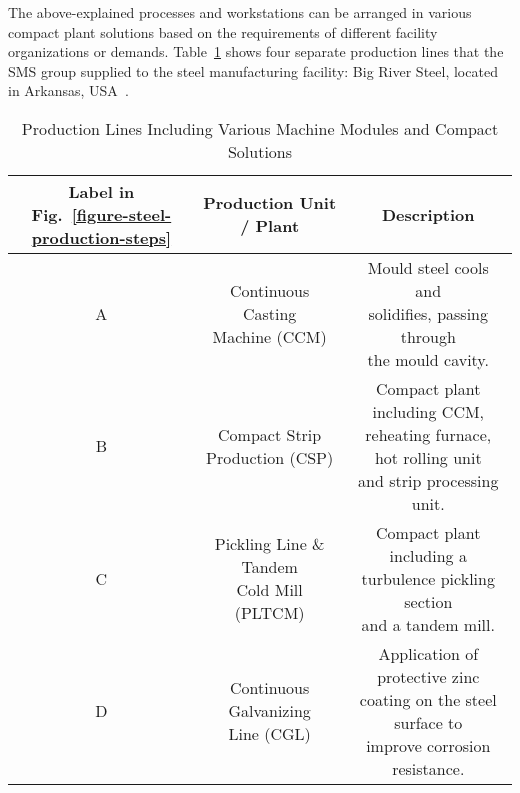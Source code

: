 The above-explained processes and workstations can be arranged in various compact plant solutions based on the requirements of different facility organizations or demands. Table~\ref{Tab: production_lines} shows four separate production lines that the SMS group supplied to the steel manufacturing facility: Big River Steel, located in Arkansas, USA~\cite{BRS}.
\begin{table}[ht!]
	\centering
	\setlength{\arrayrulewidth}{0.75pt}%
	\begin{tabular}{|c|c|c|}
		\hline
		\rowcolor[HTML]{FFFFC7} 
		\makecell{Label in\\Fig.~\ref{figure-steel-production-steps}} & Production Unit / Plant                       & Description                                                                                    \\ \hline
		A               & \makecell{Continuous Casting\\Machine (CCM)}            & \makecell{Mould steel cools and \\  solidifies, passing through \\the mould cavity.}                          \\ \hline
		B               & \makecell{Compact Strip \\Production (CSP)}              &\makecell{Compact plant including CCM,\\   reheating furnace, hot rolling unit \\and strip processing unit.}       \\ \hline
		C               & \makecell{Pickling Line \& Tandem \\Cold Mill (PLTCM)} & \makecell{Compact plant including a\\   turbulence pickling section \\and a tandem mill.}                     \\ \hline
		D               & \makecell{Continuous Galvanizing \\Line   (CGL)}         & \makecell{Application of protective zinc \\  coating on the steel surface to \\improve corrosion resistance.} \\ \hline
	\end{tabular}
	\caption{Production Lines Including Various Machine Modules and Compact Solutions}
	\label{Tab: production_lines}
\end{table}

